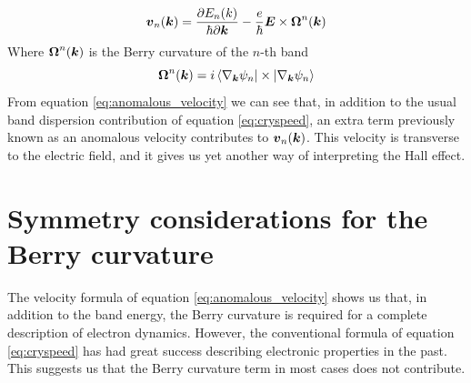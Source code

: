 \begin{equation}
    \boldsymbol{v}_n(\boldsymbol{k})=\frac{\partial E_n (k)}{\hbar\partial \boldsymbol{k}} -\frac e\hbar \boldsymbol{E}\times \boldsymbol{\Omega}^n(\boldsymbol{k})
    \label{eq:anomalous_velocity}
\end{equation}
Where $\boldsymbol{\Omega}^n(\boldsymbol{k})$ is the Berry curvature of the $n$-th band 
\begin{equation}
    \boldsymbol{\Omega}^n(\boldsymbol{k})=i\bra{\nabla_{\boldsymbol{k}}\psi_n}\times \ket{\nabla_{\boldsymbol{k}}\psi_n}      
\end{equation}
From equation \ref{eq:anomalous_velocity} we can see that, in addition to the usual band dispersion contribution of equation \ref{eq:cryspeed}, an extra term previously known as an anomalous velocity contributes to $\boldsymbol{v}_n(\boldsymbol{k})$. This velocity is transverse to the electric field, and it gives us yet another way of interpreting the Hall effect.













\section{Symmetry considerations for the Berry curvature}
The velocity formula of equation \ref{eq:anomalous_velocity} shows us that, in addition to the band energy, the Berry curvature is required for a complete description of electron dynamics. However, the conventional formula of equation \ref{eq:cryspeed} has had great success describing electronic properties in the past. This suggests us that the Berry curvature term in most cases does not contribute.

